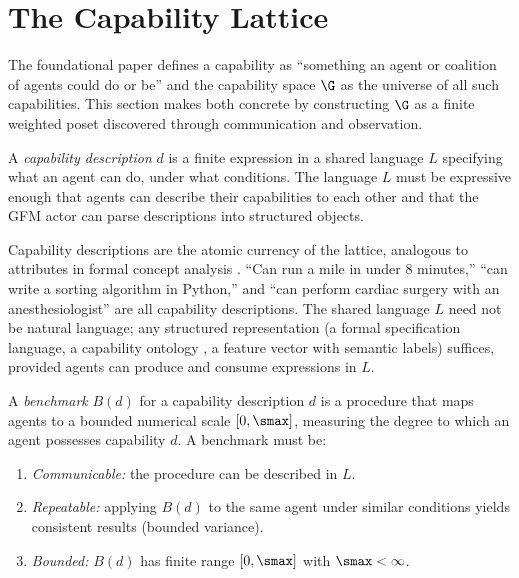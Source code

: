 \section{The Capability Lattice}
\label{sec:lattice}

The foundational paper defines a capability as ``something an agent or
coalition of agents could do or be'' and the capability space $\G$ as the
universe of all such capabilities. This section makes both concrete by
constructing $\G$ as a finite weighted poset
\citep{davey2002introduction} discovered through communication and observation.


\begin{definition}
\label{def:capability_description}
A \emph{capability description} $d$ is a finite expression in a shared
    language $L$ specifying what an agent can do, under what conditions. The
    language $L$ must be expressive enough that agents can describe their
    capabilities to each other and that the GFM actor can parse descriptions
    into structured objects.
\end{definition}

Capability descriptions are the atomic currency of the lattice, analogous to
attributes in formal concept analysis \citep{ganter1999formal}. ``Can run a
mile in under 8 minutes,'' ``can write a sorting algorithm in Python,'' and
``can perform cardiac surgery with an anesthesiologist'' are all capability
descriptions. The shared language $L$ need not be natural language; any
structured representation (a formal specification language, a capability
ontology \citep{gruber1993translation}, a feature vector with semantic labels)
suffices, provided agents can
produce and consume expressions in $L$.

\begin{definition}[Benchmark]
\label{def:benchmark}
A \emph{benchmark} $B(d)$ for a capability description $d$ is a procedure
    that maps agents to a bounded numerical scale $[0, \smax]$, measuring the
    degree to which an agent possesses capability $d$. A benchmark must be:
\begin{enumerate}
\item[\textbf{(B1)}] \emph{Communicable:} the procedure can be described in $L$.
\item[\textbf{(B2)}] \emph{Repeatable:} applying $B(d)$ to the same agent
    under similar conditions yields consistent results (bounded variance).
\item[\textbf{(B3)}] \emph{Bounded:} $B(d)$ has finite range $[0, \smax]$ with
    $\smax < \infty$.
\end{enumerate}
\end{definition}

